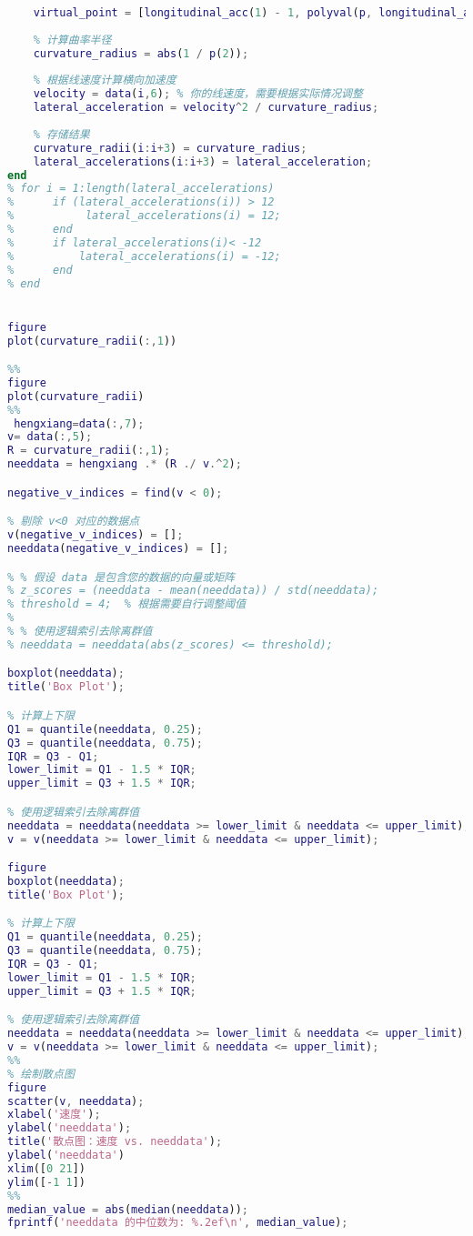 \documentclass[withoutpreface,bwprint]{cumcmthesis} %
\begin{document}
\begin{appendices}
\begin{lstlisting}[language=matlab]
    % 创建拐点的虚拟点
    virtual_point = [longitudinal_acc(1) - 1, polyval(p, longitudinal_acc(1) - 1)];
    
    % 计算曲率半径
    curvature_radius = abs(1 / p(2));
    
    % 根据线速度计算横向加速度
    velocity = data(i,6); % 你的线速度，需要根据实际情况调整
    lateral_acceleration = velocity^2 / curvature_radius;
    
    % 存储结果
    curvature_radii(i:i+3) = curvature_radius;
    lateral_accelerations(i:i+3) = lateral_acceleration;
end
% for i = 1:length(lateral_accelerations)
%      if (lateral_accelerations(i)) > 12
%           lateral_accelerations(i) = 12;
%      end
%      if lateral_accelerations(i)< -12
%          lateral_accelerations(i) = -12;
%      end
% end


figure
plot(curvature_radii(:,1))

%%
figure
plot(curvature_radii)
%%
 hengxiang=data(:,7);
v= data(:,5);
R = curvature_radii(:,1);
needdata = hengxiang .* (R ./ v.^2);

negative_v_indices = find(v < 0);

% 剔除 v<0 对应的数据点
v(negative_v_indices) = [];
needdata(negative_v_indices) = [];

% % 假设 data 是包含您的数据的向量或矩阵
% z_scores = (needdata - mean(needdata)) / std(needdata);
% threshold = 4;  % 根据需要自行调整阈值
% 
% % 使用逻辑索引去除离群值
% needdata = needdata(abs(z_scores) <= threshold);

boxplot(needdata);
title('Box Plot');

% 计算上下限
Q1 = quantile(needdata, 0.25);
Q3 = quantile(needdata, 0.75);
IQR = Q3 - Q1;
lower_limit = Q1 - 1.5 * IQR;
upper_limit = Q3 + 1.5 * IQR;

% 使用逻辑索引去除离群值
needdata = needdata(needdata >= lower_limit & needdata <= upper_limit);
v = v(needdata >= lower_limit & needdata <= upper_limit);

figure
boxplot(needdata);
title('Box Plot');

% 计算上下限
Q1 = quantile(needdata, 0.25);
Q3 = quantile(needdata, 0.75);
IQR = Q3 - Q1;
lower_limit = Q1 - 1.5 * IQR;
upper_limit = Q3 + 1.5 * IQR;

% 使用逻辑索引去除离群值
needdata = needdata(needdata >= lower_limit & needdata <= upper_limit);
v = v(needdata >= lower_limit & needdata <= upper_limit);
%%
% 绘制散点图
figure
scatter(v, needdata);
xlabel('速度');
ylabel('needdata');
title('散点图：速度 vs. needdata');
ylabel('needdata')
xlim([0 21])
ylim([-1 1])
%%
median_value = abs(median(needdata));
fprintf('needdata 的中位数为: %.2ef\n', median_value);


\end{lstlisting}
\end{appendices}
\end{document}
